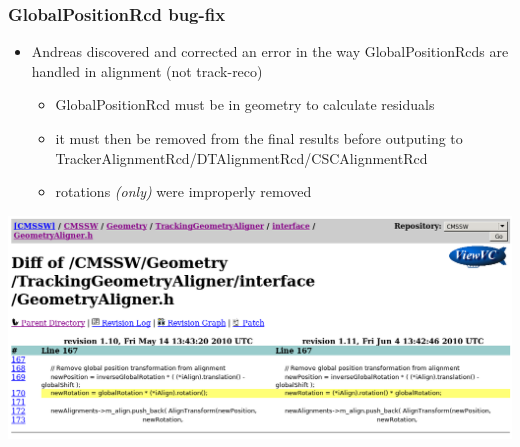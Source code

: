 \documentclass[compress]{beamer}
\begin{document}
\begin{frame}
\frametitle{GlobalPositionRcd bug-fix}

\begin{itemize}
\item Andreas discovered and corrected an error in the way GlobalPositionRcds are handled in alignment (not track-reco)
\begin{itemize}
\item GlobalPositionRcd must be in geometry to calculate
  residuals
\item it must then be removed from the final results before outputing to TrackerAlignmentRcd/DTAlignmentRcd/CSCAlignmentRcd
\item rotations {\it (only)} were improperly removed
\end{itemize}
\end{itemize}

\vfill
\includegraphics[width=\linewidth]{codeupdate.png}
\end{frame}
\end{document}
